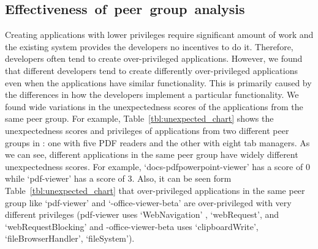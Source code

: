 \subsection{\mbox{Effectiveness of peer group analysis}}
\label{pga_effectiveness}
Creating applications with lower privileges require significant amount of work and the existing system 
provides the developers no incentives to do it. Therefore, developers often tend to create over-privileged 
applications. However, we found that different developers tend to create differently over-privileged 
applications even when the applications have similar functionality. This is primarily caused 
by the differences in how the developers implement a particular functionality. We found wide 
variations in the unexpectedness scores of the applications from the same peer group.   
For example, Table~\ref{tbl:unexpected_chart} shows the unexpectedness scores and privileges of 
applications from two different peer groups in \ChromeMarket{}: one with five PDF readers and the other 
with eight tab managers. As we can see, different applications in the same peer group have widely different unexpectedness 
scores. For example, `docs-pdfpowerpoint-viewer' has a score of $0$ while  `pdf-viewer' has a score 
of $3$. Also, it can be seen form Table~\ref{tbl:unexpected_chart} that over-privileged applications 
in the same peer group like `pdf-viewer' and `\Chrome{}-office-viewer-beta' are over-privileged with 
very different privileges (pdf-viewer uses `WebNavigation' , `webRequest', and `webRequestBlocking' and
\Chrome{}-office-viewer-beta uses `clipboardWrite', `fileBrowserHandler', `fileSystem').

